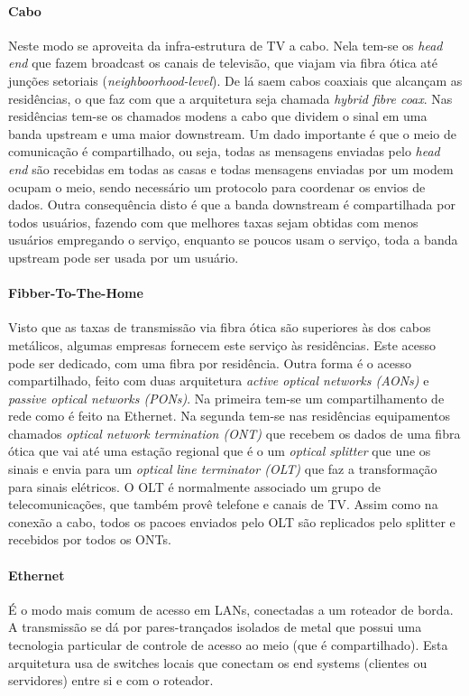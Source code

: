 \paragraph{Cabo} Neste modo se aproveita da infra-estrutura de TV a cabo. 
Nela tem-se os \emph{head end} que fazem broadcast os canais de televisão, que viajam via fibra ótica até junções setoriais (\emph{neighboorhood-level}).
De lá saem cabos coaxiais que alcançam as residências, o que faz com que a arquitetura seja chamada \emph{hybrid fibre coax}.
Nas residências tem-se os chamados modens a cabo que dividem o sinal em uma banda upstream e uma maior downstream. Um dado importante é que o meio de comunicação é compartilhado, ou seja, todas as mensagens enviadas pelo \emph{head end} são recebidas em todas as casas e todas mensagens enviadas por um modem ocupam o meio, sendo necessário um protocolo para coordenar os envios de dados.
Outra consequência disto é que a banda downstream é compartilhada por todos usuários, fazendo com que melhores taxas sejam obtidas com menos usuários empregando o serviço, enquanto se poucos usam o serviço, toda a banda upstream pode ser usada por um usuário.

\paragraph{Fibber-To-The-Home} Visto que as taxas de transmissão via fibra ótica são superiores às dos cabos metálicos, algumas empresas fornecem este serviço às residências. Este acesso pode ser dedicado, com uma fibra por residência. Outra forma é o acesso compartilhado, feito com duas arquitetura \emph{active optical networks (AONs)} e \emph{passive optical networks (PONs)}. Na primeira tem-se um compartilhamento de rede como é feito na Ethernet. 
Na segunda tem-se nas residências equipamentos chamados \emph{optical network termination (ONT)} que recebem os dados de uma fibra ótica que vai até uma estação regional que é o um \emph{optical splitter} que une os sinais e envia para um \emph{optical line terminator (OLT)} que faz a transformação para sinais elétricos. O OLT é normalmente associado um grupo de telecomunicações, que também provê telefone e canais de TV. Assim como na conexão a cabo, todos os pacoes enviados pelo OLT são replicados pelo splitter e recebidos por todos os ONTs.

\paragraph{Ethernet} É o modo mais comum de acesso em LANs, conectadas a um roteador de borda. A transmissão se dá por pares-trançados isolados de metal que possui uma tecnologia particular de controle de acesso ao meio (que é compartilhado). Esta arquitetura usa de switches locais que conectam os end systems (clientes ou servidores) entre si e com o roteador.


